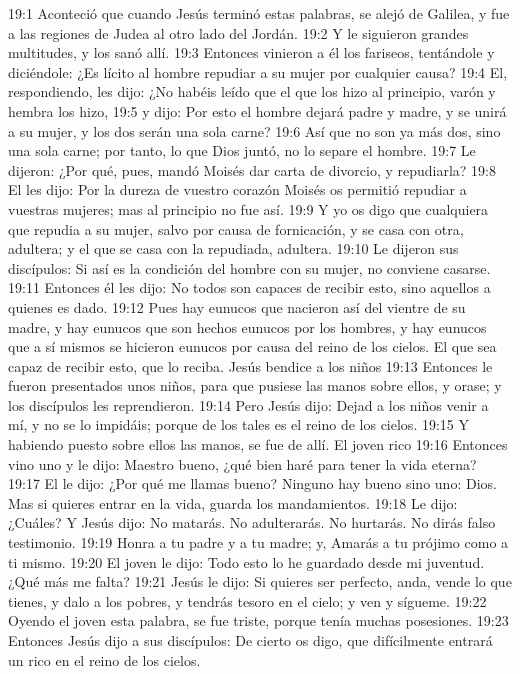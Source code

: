 19:1 Aconteció que cuando Jesús terminó estas palabras, se alejó de Galilea, y fue a las regiones de Judea al otro lado del Jordán. 
19:2 Y le siguieron grandes multitudes, y los sanó allí. 
19:3 Entonces vinieron a él los fariseos, tentándole y diciéndole: ¿Es lícito al hombre repudiar a su mujer por cualquier causa? 
19:4 El, respondiendo, les dijo: ¿No habéis leído que el que los hizo al principio, varón y hembra los hizo, 
19:5 y dijo: Por esto el hombre dejará padre y madre, y se unirá a su mujer, y los dos serán una sola carne? 
19:6 Así que no son ya más dos, sino una sola carne; por tanto, lo que Dios juntó, no lo separe el hombre. 
19:7 Le dijeron: ¿Por qué, pues, mandó Moisés dar carta de divorcio, y repudiarla? 
19:8 El les dijo: Por la dureza de vuestro corazón Moisés os permitió repudiar a vuestras mujeres; mas al principio no fue así. 
19:9 Y yo os digo que cualquiera que repudia a su mujer, salvo por causa de fornicación, y se casa con otra, adultera; y el que se casa con la repudiada, adultera. 
19:10 Le dijeron sus discípulos: Si así es la condición del hombre con su mujer, no conviene casarse. 
19:11 Entonces él les dijo: No todos son capaces de recibir esto, sino aquellos a quienes es dado. 
19:12 Pues hay eunucos que nacieron así del vientre de su madre, y hay eunucos que son hechos eunucos por los hombres, y hay eunucos que a sí mismos se hicieron eunucos por causa del reino de los cielos. El que sea capaz de recibir esto, que lo reciba. 
Jesús bendice a los niños  
19:13 Entonces le fueron presentados unos niños, para que pusiese las manos sobre ellos, y orase; y los discípulos les reprendieron. 
19:14 Pero Jesús dijo: Dejad a los niños venir a mí, y no se lo impidáis; porque de los tales es el reino de los cielos. 
19:15 Y habiendo puesto sobre ellos las manos, se fue de allí. 
El joven rico  
19:16 Entonces vino uno y le dijo: Maestro bueno, ¿qué bien haré para tener la vida eterna? 
19:17 El le dijo: ¿Por qué me llamas bueno? Ninguno hay bueno sino uno: Dios. Mas si quieres entrar en la vida, guarda los mandamientos. 
19:18 Le dijo: ¿Cuáles? Y Jesús dijo: No matarás. No adulterarás. No hurtarás. No dirás falso testimonio. 
19:19 Honra a tu padre y a tu madre; y, Amarás a tu prójimo como a ti mismo. 
19:20 El joven le dijo: Todo esto lo he guardado desde mi juventud. ¿Qué más me falta? 
19:21 Jesús le dijo: Si quieres ser perfecto, anda, vende lo que tienes, y dalo a los pobres, y tendrás tesoro en el cielo; y ven y sígueme. 
19:22 Oyendo el joven esta palabra, se fue triste, porque tenía muchas posesiones. 
19:23 Entonces Jesús dijo a sus discípulos: De cierto os digo, que difícilmente entrará un rico en el reino de los cielos. 
